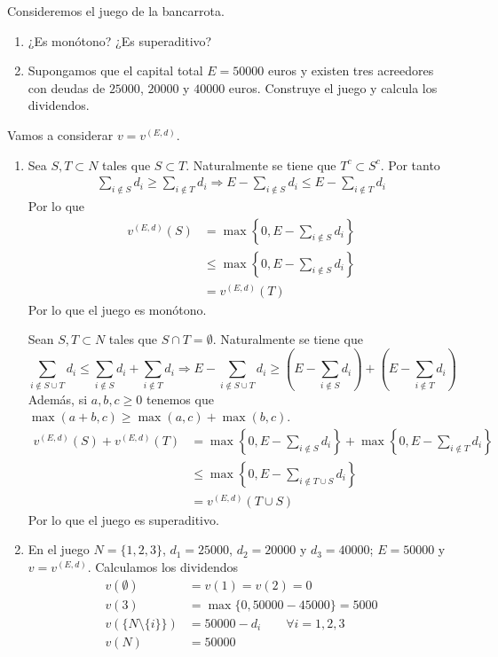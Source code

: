 \documentclass[twoside]{article}
\begin{document}
\begin{ejercicio}{2}Consideremos el juego de la bancarrota.
\begin{enumerate}
\item ¿Es monótono? ¿Es superaditivo?
\item Supongamos que el capital total $E=50000$ euros y existen tres acreedores con deudas de $25000$, $20000$ y $40000$ euros. Construye el juego y calcula los dividendos.
\end{enumerate} 
\end{ejercicio}
\begin{solucion}
Vamos a considerar $v = v^{(E,d)}$.
\begin{enumerate}
\item Sea $S,T \subset N$ tales que $S\subset T$. Naturalmente se tiene que $T^c \subset S^c$. Por tanto
\begin{gather*}
\sum_{i \notin S} d_i \geq \sum_{i \notin T} d_i \Rightarrow E -\sum_{i \notin S} d_i \leq E - \sum_{i \notin T} d_i
\end{gather*} 
Por lo que
\begin{align*}
v^{(E,d)}_{}(S) &= \max\left\{0,E-\sum_{i\notin S} d_i\right\}\\
&\leq \max\left\{0,E-\sum_{i\notin S} d_i\right\} \\
&= v^{(E,d)}(T)
\end{align*}
Por lo que el juego es monótono.

Sean $S,T\subset N$ tales que $S\cap T = \emptyset$. Naturalmente se tiene que
$$
\sum_{i \notin S\cup T} d_i \leq \sum_{i \notin S} d_i + \sum_{i \notin T} d_i \Rightarrow E - \sum_{i \notin S\cup T} d_i \geq \left(E - \sum_{i \notin S} d_i \right) + \left(E- \sum_{i \notin  T} d_i \right)
$$
Además, si $a,b,c\geq 0$ tenemos que $\max(a+b,c) \geq \max(a,c)+\max(b,c)$.  
\begin{align*}
v^{(E,d)}(S) + v^{(E,d)}(T) &=\max\left\{0,E-\sum_{i\notin S} d_i\right\} + \max\left\{0,E-\sum_{i\notin T} d_i\right\} \\
&\leq \max\left\{0,E-\sum_{i\notin T\cup S} d_i\right\} \\
&= v^{(E,d)}(T\cup S)
\end{align*}
Por lo que el juego es superaditivo.
\newpage
\item En el juego $N=\{1,2,3\}$, $d_1 = 25000$, $d_2 = 20000$ y $d_3 = 40000$; $E=50000$ y $v=v^{(E,d)}$. Calculamos los dividendos
\begin{align*}
v(\emptyset) &= v(1)=v(2) =0\\
v(3) &=  \max\{0,50000-45000\} = 5000\\
v(\{N\setminus \{i\}\})& = 50000- d_i  \qquad \forall i = 1,2,3\\
v(N) &= 50000
\end{align*}
\end{enumerate}
\end{solucion}
\newpage
\end{document}
